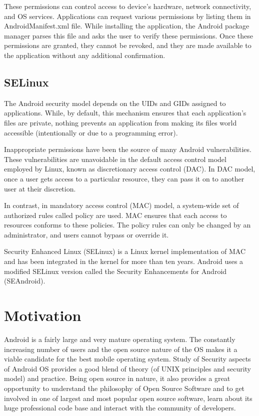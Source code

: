 These permissions can control access to device's hardware, network connectivity, and OS services. Applications can request various permissions by listing them in AndroidManifest.xml file. While installing the application, the Android package manager parses this file and asks the user to verify these permissions. Once these permissions are granted, they cannot be revoked, and they are made available to the application without any additional confirmation.

\subsection{SELinux}
The Android security model depends on the UIDs and GIDs assigned to applications. While, by default, this mechanism ensures that each application's files are private, nothing prevents an application from making its files world accessible (intentionally or due to a programming error).

Inappropriate permissions have been the source of many Android vulnerabilities. These vulnerabilities are unavoidable in the default access control model employed by Linux, known as discretionary access control (DAC). In DAC model, once a user gets access to a particular resource, they can pass it on to another user at their discretion.

In contrast, in mandatory access control (MAC) model, a system-wide set of authorized rules called policy are used. MAC ensures that each access to resources conforms to these policies. The policy rules can only be changed by an administrator, and users cannot bypass or override it.

Security Enhanced Linux (SELinux) is a Linux kernel implementation of MAC and has been integrated in the kernel for more than ten years. Android uses a modified SELinux version called the Security Enhancements for Android (SEAndroid).



\section{Motivation}
Android is a fairly large and very mature operating system. The constantly increasing number of users and the open source nature of the OS makes it a viable candidate for the best mobile operating system. Study of Security aspects of Android OS provides a good blend of theory (of UNIX principles and security model) and practice. Being open source in nature, it also provides a great opportunity to understand the philosophy of Open Source Software and to get involved in one of largest and most popular open source software, learn about its huge professional code base and interact with the community of developers.